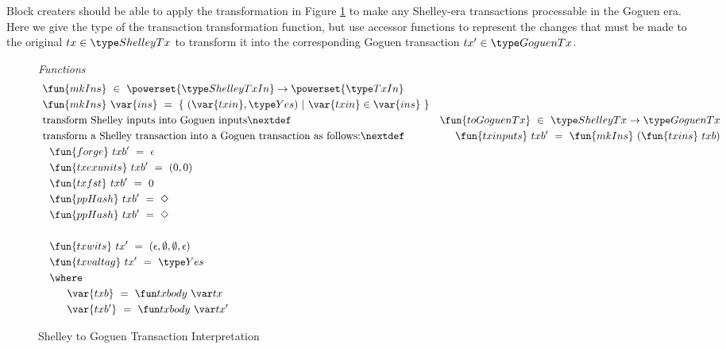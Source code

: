 Block creaters should be able to apply the transformation in Figure
\ref{fig:functions:to-shelley} to make any Shelley-era transactions
processable in the Goguen era. Here we give the type of the
transaction transformation function, but use accessor functions to
represent the changes that must be made to the original $tx \in \ShelleyTx$
to transform it into the corresponding Goguen transaction $tx' \in \GoguenTx$.

\begin{figure}[htb]
  \emph{Functions}
  \begin{align*}
      & \fun{mkIns} ~\in~ \powerset{\ShelleyTxIn} \to \powerset{\TxIn}  \\
      & \fun{mkIns}~\var{ins} ~=~ \{~ (\var{txin}, \Yes) ~\vert~
      \var{txin} \in \var{ins}~\} \\
      & \text{transform Shelley inputs into Goguen inputs}
      \nextdef
      & \fun{toGoguenTx} ~\in~  \ShelleyTx \to \GoguenTx \\
      & \text{transform a Shelley transaction into a Goguen transaction as follows:}
      \nextdef
      & ~~\fun{txinputs}~{txb'} ~=~ \fun{mkIns}~(\fun{txins}~{txb}) \\
      & ~~\fun{forge}~{txb'} ~= ~\epsilon \\
      & ~~\fun{txexunits}~{txb'} ~= ~(0,0) \\
      & ~~\fun{txfst}~{txb'} ~= ~0 \\
      & ~~\fun{ppHash}~{txb'} ~= ~\Nothing \\
      & ~~\fun{ppHash}~{txb'} ~= ~\Nothing \\~\\
      & ~~\fun{txwits}~{tx'} ~= ~(\epsilon,\emptyset,\emptyset,\epsilon) \\
      & ~~\fun{txvaltag}~{tx'} ~= ~\Yes \\
      &~~      \where \\
      & ~~~~~~~ \var{txb}~=~\txbody{tx} \\
      & ~~~~~~~ \var{txb'}~=~\txbody{tx'}
  \end{align*}
  \caption{Shelley to Goguen Transaction Interpretation}
  \label{fig:functions:to-shelley}
\end{figure}
